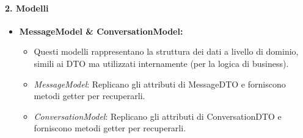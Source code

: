     \paragraph{2. Modelli}
    \begin{itemize}
        \item \textbf{MessageModel \& ConversationModel:}
        \begin{itemize}
            \item Questi modelli rappresentano la struttura dei dati a livello di dominio, simili ai DTO ma utilizzati internamente (per la logica di business).
            \item \textit{MessageModel}: Replicano gli attributi di MessageDTO e forniscono metodi getter per recuperarli.
            \item \textit{ConversationModel}: Replicano gli attributi di ConversationDTO e forniscono metodi getter per recuperarli.
        \end{itemize}
    \end{itemize}

